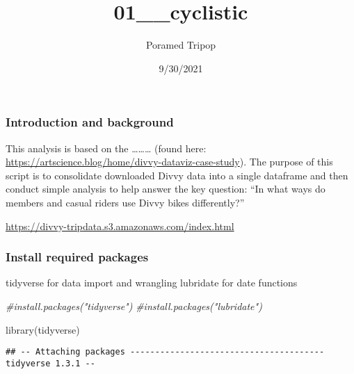 \documentclass[
]{article}
\title{01\_\_cyclistic}
\author{Poramed Tripop}
\date{9/30/2021}
\newenvironment{Shaded}{\begin{snugshade}}{\end{snugshade}}
\newcommand{\AttributeTok}[1]{\textcolor[rgb]{0.77,0.63,0.00}{#1}}
\newcommand{\CommentTok}[1]{\textcolor[rgb]{0.56,0.35,0.01}{\textit{#1}}}
\newcommand{\ConstantTok}[1]{\textcolor[rgb]{0.00,0.00,0.00}{#1}}
\newcommand{\FunctionTok}[1]{\textcolor[rgb]{0.00,0.00,0.00}{#1}}
\newcommand{\NormalTok}[1]{#1}
\newcommand{\SpecialCharTok}[1]{\textcolor[rgb]{0.00,0.00,0.00}{#1}}
\begin{document}
\maketitle

\begin{Shaded}
\end{Shaded}

\hypertarget{introduction-and-background}{%
\subsubsection{Introduction and
background}\label{introduction-and-background}}

This analysis is based on the \ldots\ldots\ldots{} (found here:
\url{https://artscience.blog/home/divvy-dataviz-case-study}). The
purpose of this script is to consolidate downloaded Divvy data into a
single dataframe and then conduct simple analysis to help answer the key
question: ``In what ways do members and casual riders use Divvy bikes
differently?''

\url{https://divvy-tripdata.s3.amazonaws.com/index.html}

\hypertarget{install-required-packages}{%
\subsubsection{Install required
packages}\label{install-required-packages}}

tidyverse for data import and wrangling lubridate for date functions

\begin{Shaded}
\begin{Highlighting}[]
\CommentTok{\#install.packages("tidyverse")}
\CommentTok{\#install.packages("lubridate")}
\end{Highlighting}
\end{Shaded}

\begin{Shaded}
\begin{Highlighting}[]
\FunctionTok{library}\NormalTok{(tidyverse)}
\end{Highlighting}
\end{Shaded}

\begin{verbatim}
## -- Attaching packages --------------------------------------- tidyverse 1.3.1 --
\end{verbatim}
\end{document}
